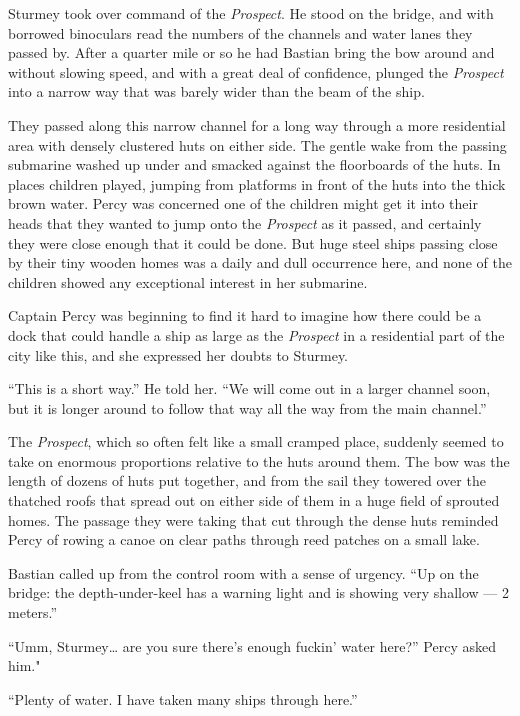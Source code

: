\documentclass[]{scrbook}
\begin{document}
Sturmey took over command of the \emph{Prospect}. He stood on the
bridge, and with borrowed binoculars read the numbers of the channels
and water lanes they passed by. After a quarter mile or so he had
Bastian bring the bow around and without slowing speed, and with a great
deal of confidence, plunged the \emph{Prospect} into a narrow way that
was barely wider than the beam of the ship.

They passed along this narrow channel for a long way through a more
residential area with densely clustered huts on either side. The gentle
wake from the passing submarine washed up under and smacked against the
floorboards of the huts. In places children played, jumping from
platforms in front of the huts into the thick brown water. Percy was
concerned one of the children might get it into their heads that they
wanted to jump onto the \emph{Prospect} as it passed, and certainly they
were close enough that it could be done. But huge steel ships passing
close by their tiny wooden homes was a daily and dull occurrence here,
and none of the children showed any exceptional interest in her
submarine.

Captain Percy was beginning to find it hard to imagine how there could
be a dock that could handle a ship as large as the \emph{Prospect} in a
residential part of the city like this, and she expressed her doubts to
Sturmey.

``This is a short way.'' He told her. ``We will come out in a larger
channel soon, but it is longer around to follow that way all the way
from the main channel.''

The \emph{Prospect}, which so often felt like a small cramped place,
suddenly seemed to take on enormous proportions relative to the huts
around them. The bow was the length of dozens of huts put together, and
from the sail they towered over the thatched roofs that spread out on
either side of them in a huge field of sprouted homes. The passage they
were taking that cut through the dense huts reminded Percy of rowing a
canoe on clear paths through reed patches on a small lake.

Bastian called up from the control room with a sense of urgency. ``Up on
the bridge: the depth-under-keel has a warning light and is showing very
shallow --- 2 meters.''

``Umm, Sturmey\ldots{} are you sure there's enough fuckin' water here?''
Percy asked him."

``Plenty of water. I have taken many ships through here.''
\end{document}
